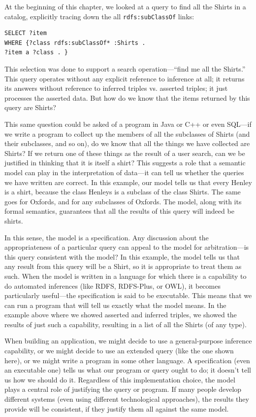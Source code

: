 At the beginning of this chapter, we looked at a query to find all the
Shirts in a catalog, explicitly tracing down the all \texttt{rdfs:subClassOf}
links:

\begin{lstlisting}
SELECT ?item
WHERE {?class rdfs:subClassOf* :Shirts .
?item a ?class . }
\end{lstlisting}

This selection was done to support a search operation---``find me all
the Shirts.'' This query operates without any explicit reference to
inference at all; it returns its answers without reference to inferred
triples vs. asserted triples; it just processes the asserted data. But
how do we know that the items returned by this query are Shirts?

This same question could be asked of a program in Java or C++ or even
SQL---if we write a program to collect up the members of all the
subclasses of Shirts (and their subclasses, and so on), do we know that
all the things we have collected are Shirts? If we return one of these
things as the result of a user search, can we be justified in thinking
that it is itself a shirt? This suggests a role that a semantic model
can play in the interpretation of data---it can tell us whether the
queries we have written are correct. In this example, our model tells us
that every Henley is a shirt, because the class Henleys is a subclass of
the class Shirts. The same goes for Oxfords, and for any subclasses of
Oxfords. The model, along with its formal semantics, guarantees that all
the results of this query will indeed be shirts.

In this sense, the model is a specification. Any discussion about the
appropriateness of a particular query can appeal to the model for
arbitration---is this query consistent with the model? In this example,
the model tells us that any result from this query will be a Shirt, so
it is appropriate to treat them as such. When the model is written in a
language for which there is a capability to do automated inferences
(like RDFS, RDFS-Plus, or OWL), it becomes particularly useful---the
specification is said to be executable. This means that we can run a
program that will tell us exactly what the model means. In the example
above where we showed asserted and inferred triples, we showed the
results of just such a capability, resulting in a list of all the Shirts
(of any type).

When building an application, we might decide to use a general-purpose
inference capability, or we might decide to use an extended query (like
the one shown here), or we might write a program in some other language.
A specification (even an executable one) tells us what our program or
query ought to do; it doesn't tell us how we should do it. Regardless of
this implementation choice, the model plays a central role of justifying
the query or program. If many people develop different systems (even
using different technological approaches), the results they provide will
be consistent, if they justify them all against the same model.


